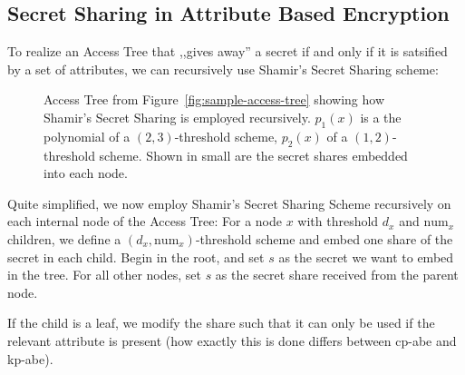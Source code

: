 \subsection{Secret Sharing in Attribute Based Encryption}
To realize an Access Tree that ,,gives away'' a secret if and only if it is satsified by a set of attributes, we can recursively use Shamir's Secret Sharing scheme:

\begin{figure}
    \centering
    \caption[Shamir's Secret sharing in Access Trees]{
        Access Tree from Figure~\ref{fig:sample-access-tree} showing how Shamir's Secret Sharing is employed recursively.
        $p_1(x)$ is a the polynomial of a $(2,3)$-threshold scheme, $p_2(x)$ of a $(1,2)$-threshold scheme.
        Shown in small are the secret shares embedded into each node.
    }
    \label{fig:sample-access-tree-shamir}
\end{figure}

Quite simplified, we now employ Shamir's Secret Sharing Scheme recursively on each internal node of the Access Tree:
For a node $x$ with threshold $d_x$ and $\text{num}_x$ children, we define a $(d_x, \text{num}_x)$-threshold scheme and embed one share of the secret in each child.
Begin in the root, and set $s$ as the secret we want to embed in the tree. For all other nodes, set $s$ as the secret share received from the parent node.

If the child is a leaf, we modify the share such that it can only be used if the relevant attribute is present (how exactly this is done differs between \acrshort{cp-abe} and \acrshort{kp-abe}).

